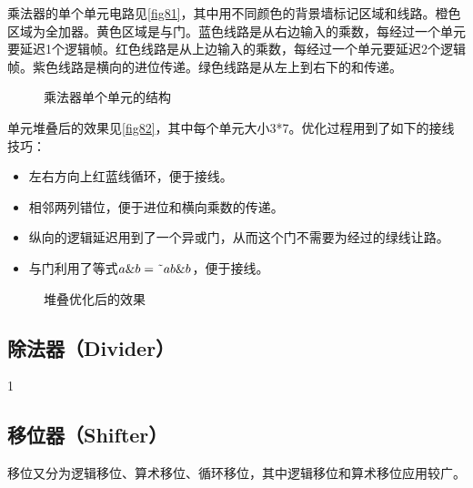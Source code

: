 乘法器的单个单元电路见\autoref{fig81}，其中用不同颜色的背景墙标记区域和线路。橙色区域为全加器。黄色区域是与门。蓝色线路是从右边输入的乘数，每经过一个单元要延迟1个逻辑帧。红色线路是从上边输入的乘数，每经过一个单元要延迟2个逻辑帧。紫色线路是横向的进位传递。绿色线路是从左上到右下的和传递。

\begin{figure}[!ht]
  \centering
  \caption{乘法器单个单元的结构}\label{fig81}
\end{figure}

单元堆叠后的效果见\autoref{fig82}，其中每个单元大小3*7。优化过程用到了如下的接线技巧：
\begin{itemize}
  \item 左右方向上红蓝线循环，便于接线。
  \item 相邻两列错位，便于进位和横向乘数的传递。
  \item 纵向的逻辑延迟用到了一个异或门，从而这个门不需要为经过的绿线让路。
  \item 与门利用了等式$a\&b=\textrm{\~{}} ab\&b$，便于接线。
\end{itemize}

\begin{figure}[!ht]
  \centering
  \caption{堆叠优化后的效果}\label{fig82}
\end{figure}

\subsection{除法器（Divider）}
1
\subsection{移位器（Shifter）}
移位又分为逻辑移位、算术移位、循环移位，其中逻辑移位和算术移位应用较广。

